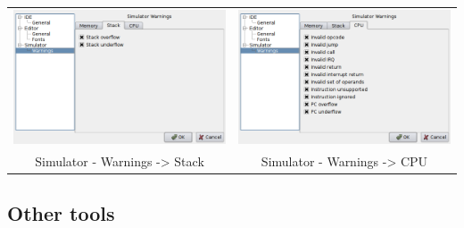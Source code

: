         \begin{table}[h!]
            \begin{tabular}{cc}
                \includegraphics[width=.5\textwidth]{img/NewImg/interface5.png}
                    &
                \includegraphics[width=.5\textwidth]{img/NewImg/interface6.png}
                    \\
                Simulator - Warnings -> Stack & Simulator - Warnings -> CPU
            \end{tabular}
        \end{table}

        
\subsection{Other tools}

